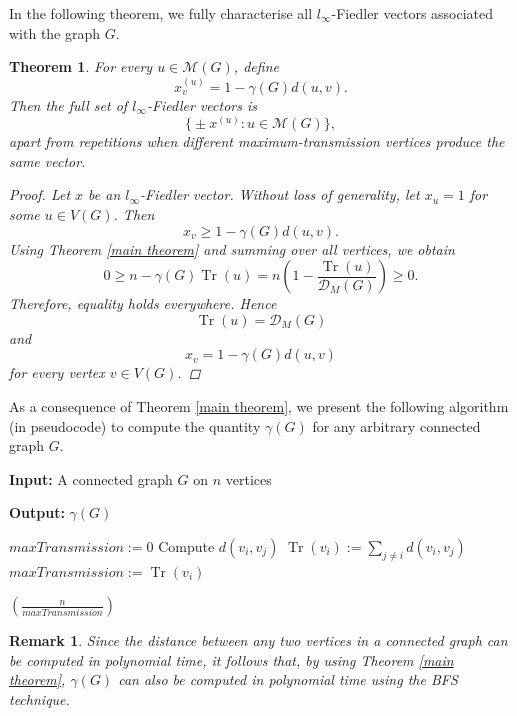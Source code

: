 \documentclass[12pt]{article}
\newtheorem{theorem}{Theorem}[section]
\newtheorem{remark}{Remark}[section]
\DeclareMathOperator{\tr}{Tr}
\begin{document}
{{$$			$$
			In the following theorem, we fully characterise all $l_\infty$-Fiedler vectors associated with the graph $G$.
			\begin{theorem}\label{set of vectors}
				For every $u \in \mathcal{M}(G)$, define
				$$
				x^{(u)}_v=1-\gamma(G)d(u,v).
				$$
				Then the full set of $l_\infty$-Fiedler vectors is 
				$$
				\biggl\{\pm x^{(u)} : u \in \mathcal{M}(G) \biggr\},
				$$
				apart from repetitions when different maximum-transmission vertices produce the same vector.
				\begin{proof}
					Let $x$ be an $l_\infty$-Fiedler vector. Without loss of generality, let $x_u=1$ for some $u \in V(G)$. Then
					$$
					x_v \geq 1- \gamma(G) d(u,v).
					$$
					Using Theorem \ref{main theorem} and summing over all vertices, we obtain
					$$
					0\geq n-\gamma(G) \tr(u)=n(1-\frac{\tr(u)}{\mathcal{D}_M(G)})\geq 0.
					$$
					Therefore, equality holds everywhere. Hence 
					$$
					\tr(u)=\mathcal{D}_M(G)
					$$
					and 
					$$
					x_v = 1- \gamma(G) d(u,v)
					$$
					for every vertex $v \in V(G)$.
				\end{proof}
			\end{theorem}
			As a consequence of Theorem \ref{main theorem}, we present the following algorithm (in pseudocode) to compute the quantity $\gamma(G)$ for any arbitrary connected graph $G$.
			\begin{algorithm}[H]
				\caption{Algorithm to compute $\gamma(G) $}
				\textbf{Input:} A connected graph $G$ on $n$ vertices
				
				
				\textbf{Output:} $\gamma(G)$
				
				\begin{algorithmic}[1]
					\State $maxTransmission := 0$
					\State Compute $d(v_i, v_j)$ %
					\EndFor
					\State $\tr(v_i) := \sum\limits_{j \ne i} d(v_i, v_j)$ %
					\If{$\tr(v_i) > maxTransmission$}
					\State $maxTransmission := \tr(v_i)$
					
					\EndIf
					\EndFor
					\State \Return $(\frac{n} {maxTransmission})$
				\end{algorithmic}
			\end{algorithm}
			\begin{remark} Since the distance between any two vertices in a connected graph can be computed in polynomial time, it follows that, by using Theorem \ref{main theorem}, $\gamma(G)$ can also be computed in polynomial time using the BFS technique.
			\end{remark}
			
}}
\end{document}
